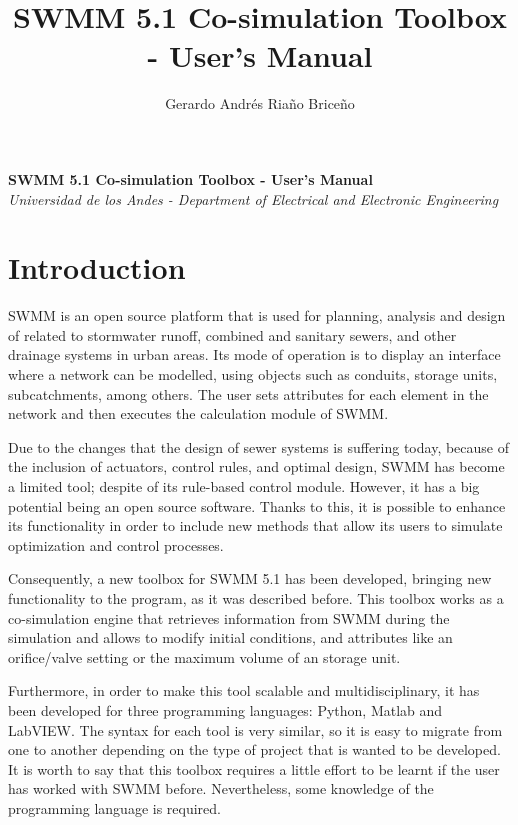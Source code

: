 \documentclass[11pt, letterpaper]{article}
\title{SWMM 5.1 Co-simulation Toolbox - User's Manual}
\author{Gerardo Andrés Riaño Briceño}
\begin{document}
\vspace*{\fill}
   \begin{center}
      \Large\textbf{SWMM 5.1 Co-simulation Toolbox - User's Manual}\\
      \small\textit{Universidad de los Andes - Department of Electrical and Electronic Engineering}
   \end{center}
\vspace*{\fill}
\pagebreak

\tableofcontents
\pagebreak


\setcounter{secnumdepth}{1}
\section{Introduction}
\setlength\parindent{0pt}
SWMM is an open source platform that is used for planning, analysis and design of related to stormwater runoff, combined and sanitary sewers, and other drainage systems in urban areas. Its mode of operation is to display an interface where a network can be modelled, using objects such as conduits, storage units, subcatchments, among others. The user sets attributes for each element in the network and then executes the calculation module of SWMM. 
\setlength\parindent{12pt}

Due to the changes that the design of sewer systems is suffering today, because of the inclusion of actuators, control rules, and optimal design, SWMM has become a limited tool; despite of its rule-based control module. However, it has a big potential being an open source software. Thanks to this, it is possible to enhance its functionality in order to include new methods that allow its users to simulate optimization and control processes. 

Consequently, a new toolbox for SWMM 5.1 has been developed, bringing new functionality to the program, as it was described before. This toolbox works as a co-simulation engine that retrieves information from SWMM during the simulation and allows to modify initial conditions, and attributes like an orifice/valve setting or the maximum volume of an storage unit.

Furthermore, in order to make this tool scalable and multidisciplinary, it has been developed for three programming languages: Python, Matlab and LabVIEW. The syntax for each tool is very similar, so it is easy to migrate from one to another depending on the type of project that is wanted to be developed. It is worth to say that this toolbox requires a little effort to be learnt if the user has worked with SWMM before. Nevertheless, some knowledge of the programming language is required. \\
\end{document}
